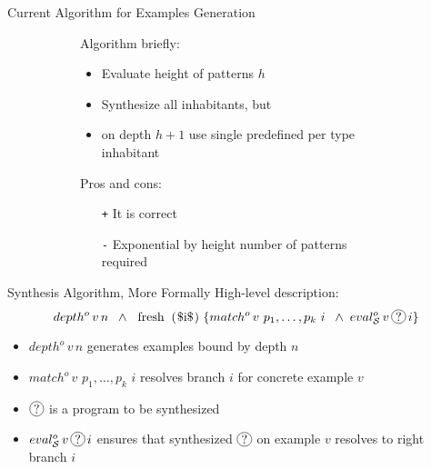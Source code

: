 \documentclass[aspectratio=169
  , xcolor={svgnames}
  , hyperref={ colorlinks,citecolor=Blue
             , linkcolor=DarkRed,urlcolor=DarkBlue}
  , russian
  ]{beamer}
\newcommand*\circled[1]{\tikz[baseline=(char.base)]{
    \node[shape=circle,draw,inner sep=1pt] (char) {#1};}}
\begin{document}
\begin{frame}{Current Algorithm for Examples Generation}
\begin{figure}
\begin{subfigure}[b]{0.45\linewidth}
Algorithm briefly:
\begin{itemize}
\item Evaluate height of patterns $h$
\item Synthesize all inhabitants, but
\item on depth $h+1$ use single predefined per type inhabitant 
\end{itemize}
\end{subfigure}
\hspace{.5cm}
\begin{subfigure}[b]{0.45\linewidth}
Pros and cons:
\begin{itemize}
\item[\texttt{+}] It is correct
\item[\texttt{-}] Exponential by height number of patterns required
\end{itemize}
\end{subfigure}
\end{figure}

\end{frame}


\begin{frame}{Synthesis Algorithm, More Formally }
High-level description:
\[
depth^o\,v\,n \;\; \wedge \;\;
\mbox{\lstinline|fresh ($i$)|}\; \{match^o\,v\,\,p_1,\dots,p_k\,\,i \;\;\wedge \;
eval^o_{\mathcal S}\,v\,\circled{?}\,i\}
\]

\begin{itemize}
\item $depth^o\,v\,n$ generates examples bound by depth $n$
\item $match^o\,v\,\,p_1,\dots,p_k\,\,i$ resolves branch $i$ for concrete example $v$
\item $\circled{?}$ is a program to be synthesized
\item $eval^o_{\mathcal S}\,v\,\circled{?}\,i$ ensures that synthesized $\circled{?}$ on example $v$ resolves to right branch $i$
\end{itemize}


\end{frame}
\end{document}
